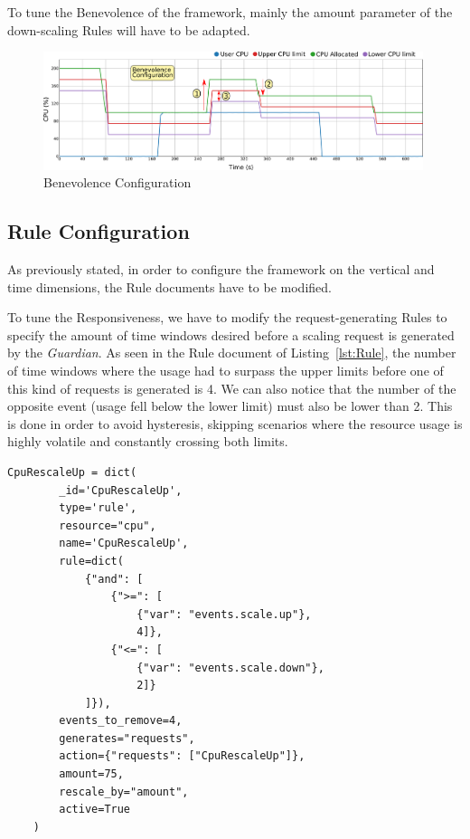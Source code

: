 \documentclass[12pt]{article}
\begin{document}
To tune the Benevolence of the framework, mainly the amount parameter of the down-scaling Rules will have to be adapted.

\begin{figure}[!tb]
	\centering
	\includegraphics[width=0.99\textwidth]{../img/configuration/configuration_benevolence.png}
	\caption{Benevolence Configuration}
	\label{fig:BenevolenceConfiguration}
\end{figure}

\subsection{Rule Configuration}

As previously stated, in order to configure the framework on the vertical and time dimensions, the Rule documents have to be modified. 

To tune the Responsiveness, we have to modify the request-generating Rules to specify the amount of time windows desired before a scaling request is generated by the \textit{Guardian}. As seen in the Rule document of Listing~\ref{lst:Rule}, the number of time windows where the usage had to surpass the upper limits before one of this kind of requests is generated is 4. We can also notice that the number of the opposite event (usage fell below the lower limit) must also be lower than 2. This is done in order to avoid hysteresis, skipping scenarios where the resource usage is highly volatile and constantly crossing both limits.

\begin{center}
	\lstset{basicstyle=\footnotesize}
	\lstset{linewidth=1\textwidth}
	\lstset{language=perl}
	\lstset{xleftmargin=0.0725\textwidth}
	\lstset{showstringspaces=false}
	\lstset{captionpos=b}
	\lstset{numbers=left}
	\lstset{tabsize=1}
	\begin{lstlisting}[float=bt,frame=bt,caption=Example of a Limit document,label=lst:Rule]
	CpuRescaleUp = dict(
		_id='CpuRescaleUp',
		type='rule',
		resource="cpu",
		name='CpuRescaleUp',
		rule=dict(
			{"and": [
				{">=": [
					{"var": "events.scale.up"},
					4]},
				{"<=": [
					{"var": "events.scale.down"},
					2]}
			]}),
		events_to_remove=4,
		generates="requests",
		action={"requests": ["CpuRescaleUp"]},
		amount=75,
		rescale_by="amount",
		active=True
	)
	\end{lstlisting}
\end{center}
\end{document}
